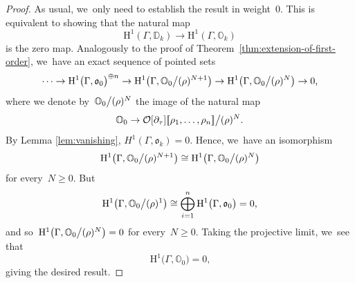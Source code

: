 \documentclass[10pt,a4paper]{article}
\numberwithin{equation}{section}
\theoremstyle{plain}
\theoremstyle{definition}
\newcommand{\tx}{\text}
\newcommand{\bbD}{\ensuremath{\mathbb{D}}}
\newcommand{\bbO}{\ensuremath{\mathbb{O}}}
\newcommand{\cO}{\ensuremath{\mathcal{O}}}
\newcommand{\frako}{\ensuremath{\mathfrak{o}}}
\newcommand{\rmH}{\ensuremath{\mathrm{H}}}
\newcommand{\llbrkt}{[\![}
\newcommand{\rrbrkt}{]\!]}
\let\Ga\Gamma
\begin{document}
\begin{proof}
As usual, we~only need to establish the result in weight~$0$. This is equivalent to showing that the natural map
\begin{equation*}
\rmH^1(\Ga,\bbD_k)
\to
\rmH^1(\Ga,\bbO_k)
\end{equation*}
is the zero map. Analogously to the proof of Theorem~\ref{thm:extension-of-first-order}, we~have an exact sequence of pointed sets
\begin{equation*}
\cdots \to
\rmH^1\bigl(\Ga, \frako_0\bigr)^{\oplus n}
\to
\rmH^1\bigl(\Ga, \bbO_0\big\slash (\rho)^{N+1} \bigr)
\to
\rmH^1\bigl(\Ga, \bbO_0\big\slash (\rho)^{N} \bigr)
\to
0
\tx{,}
\end{equation*}
where we denote by~$\bbO_0\big\slash (\rho)^N$ the image of the natural map
\begin{equation*}
	\bbO_0
\to
	\cO[\partial_\tau]\llbrkt \rho_1,\ldots,\rho_n\rrbrkt \big\slash (\rho)^N
\tx{.}
\end{equation*}
By Lemma \ref{lem:vanishing}, $H^1(\Ga,\frako_k)=0$. Hence, we~have an isomorphism
\begin{equation*}
\rmH^1\bigl(\Ga, \bbO_0\big\slash (\rho)^{N+1} \bigr)
\cong
\rmH^1\bigl(\Ga, \bbO_0\big\slash (\rho)^{N} \bigr)
\end{equation*}
for every~$N\geq 0$. But
\begin{equation*}
\rmH^1\bigl(\Ga, \bbO_0\big\slash (\rho)^{1} \bigr)
\cong
\bigoplus_{i=1}^n \rmH^1\bigl(\Ga, \frako_0\bigr) = 0
\tx{,}
\end{equation*}
and so~$\rmH^1\bigl(\Ga, \bbO_0\big\slash (\rho)^{N}\bigr)=0$ for every~$N\geq 0$. Taking the projective limit, we~see that
\[
\rmH^1\bigl(\Ga, \bbO_0\bigr)=0\tx{,}\]
giving the desired result.
\end{proof}
\end{document}
